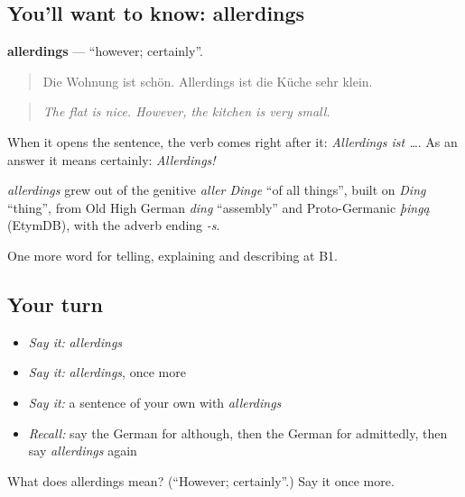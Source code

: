 \subsection*{You'll want to know: allerdings}
\textbf{allerdings} — \textquotedblleft{}however; certainly\textquotedblright{}.

\begin{quote}
Die Wohnung ist schön. Allerdings ist die Küche sehr klein.
\end{quote}

\begin{quote}
\emph{The flat is nice. However, the kitchen is very small.}
\end{quote}

When it opens the sentence, the verb comes right after it: \emph{Allerdings ist …}. As an answer it means certainly: \emph{Allerdings!}

\begin{cousinweb}
\emph{allerdings} grew out of the genitive \emph{aller Dinge} \textquotedblleft{}of all things\textquotedblright{}, built on \emph{Ding} \textquotedblleft{}thing\textquotedblright{}, from Old High German \emph{ding} \textquotedblleft{}assembly\textquotedblright{} and Proto-Germanic \emph{þingą} (EtymDB), with the adverb ending \emph{-s}.
\end{cousinweb}

\begin{grammarlens}[title={What you've built}]
One more word for telling, explaining and describing at B1.
\end{grammarlens}

\subsection*{Your turn}
\begin{itemize}
\raggedright
  \item \emph{Say it:} \emph{allerdings}
  \item \emph{Say it:} \emph{allerdings}, once more
  \item \emph{Say it:} a sentence of your own with \emph{allerdings}
  \item \emph{Recall:} say the German for although, then the German for admittedly, then say \emph{allerdings} again
\end{itemize}

\begin{tcolorbox}[breakable,colback=teal!4,colframe=teal!35!black,title={Before you move on}]
What does allerdings mean? (\textquotedblleft{}However; certainly\textquotedblright{}.) Say it once more.
\end{tcolorbox}
